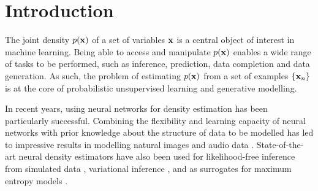 
\begin{abstract}
Autoregressive models are among the best performing neural density estimators. We describe an approach for increasing the flexibility of an autoregressive model, based on modelling the random numbers that the model uses internally when generating data. By constructing a stack of autoregressive models, each modelling the random numbers of the next model in the stack, we obtain a type of normalizing flow suitable for density estimation, which we call Masked Autoregressive Flow. This type of flow is closely related to Inverse Autoregressive Flow and is a generalization of Real NVP\@. Masked Autoregressive Flow achieves state-of-the-art performance in a range of general-purpose density estimation tasks.
\end{abstract}


\section{Introduction}
\label{sec:introduction}

The joint density $p\mathopen{}\left(\mathbf{x}\right)\mathclose{}$ of a set of variables $\mathbf{x}$ is a central object of interest in machine learning. Being able to access and manipulate $p\mathopen{}\left(\mathbf{x}\right)\mathclose{}$ enables a wide range of tasks to be performed, such as inference, prediction, data completion and data generation. As such, the problem of estimating $p\mathopen{}\left(\mathbf{x}\right)\mathclose{}$ from a set of examples $\left\{\mathbf{x}_n\right\}$ is at the core of probabilistic unsupervised learning and generative modelling.

In recent years, using neural networks for density estimation has been particularly successful. Combining the flexibility and learning capacity of neural networks with prior knowledge about the structure of data to be modelled has led to impressive results in modelling natural images \citep{Theis:2015, VanDenOord:2016:PixelRNN, VanDenOord:2016:PixelCNN, Dinh:2017, Salimans:2017} and audio data \citep{Uria:2015, VanDenOord:2016:WaveNet}. State-of-the-art neural density estimators have also been used for likelihood-free inference from simulated data \citep{Paige:2016, Papamakarios:2016}, variational inference \citep{Rezende:2015, Kingma:2016}, and as surrogates for maximum entropy models \citep{Ganem:2017}.

